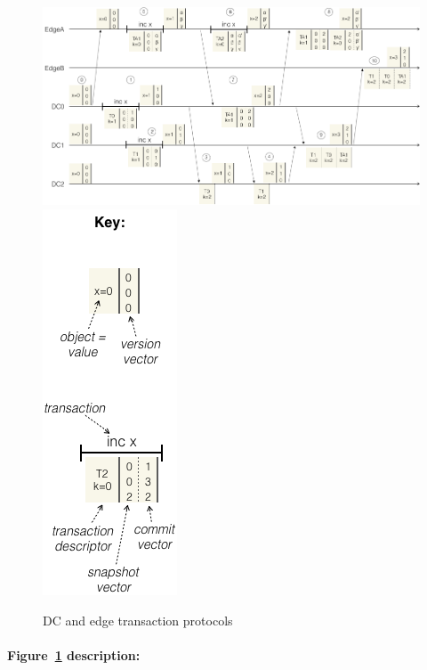 \begin{figure}[tph]
  \centering
  \hfill
  \includegraphics[scale=0.45]{figures/commit-protocol-main.png}
  \hfill
  \includegraphics[scale=0.45]{figures/commit-protocol-key.png}
  \hfill
  \caption{DC and edge transaction protocols}
  \label{fig:commit-protocol}
\end{figure}

\paragraph{Figure~\ref{fig:commit-protocol} description:}


